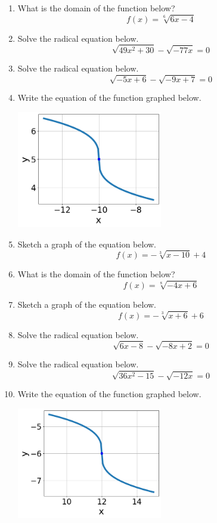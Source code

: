 \documentclass[14pt]{extbook}
\begin{document}
\begin{enumerate}
{\begin{center}
\end{center}
} \newpage
\item{
What is the domain of the function below?\[ f(x) = \sqrt[6]{6 x - 4} \]} \newpage
\item{
Solve the radical equation below.\[ \sqrt{49 x^2 + 30} - \sqrt{-77 x} = 0 \]} \newpage
\item{
Solve the radical equation below.\[ \sqrt{-5 x + 6} - \sqrt{-9 x + 7} = 0 \]} \newpage
\item{
Write the equation of the function graphed below.
\begin{center}
    \includegraphics[width=0.5\textwidth]{../Figures/radicalGraphToEquationC.png}
\end{center}
} \newpage
\item{
Sketch a graph of the equation below.\[ f(x) = - \sqrt[3]{x - 10} + 4 \]} \newpage
\item{
What is the domain of the function below?\[ f(x) = \sqrt[8]{-4 x + 6} \]} \newpage
\item{
Sketch a graph of the equation below.\[ f(x) = - \sqrt[3]{x + 6} + 6 \]} \newpage
\item{
Solve the radical equation below.\[ \sqrt{6 x - 8} - \sqrt{-8 x + 2} = 0 \]} \newpage
\item{
Solve the radical equation below.\[ \sqrt{36 x^2 - 15} - \sqrt{-12 x} = 0 \]} \newpage
\item{
Write the equation of the function graphed below.
\begin{center}
    \includegraphics[width=0.5\textwidth]{../Figures/radicalGraphToEquationCopyC.png}
\end{center}
} \newpage
\end{enumerate}
\end{document}
